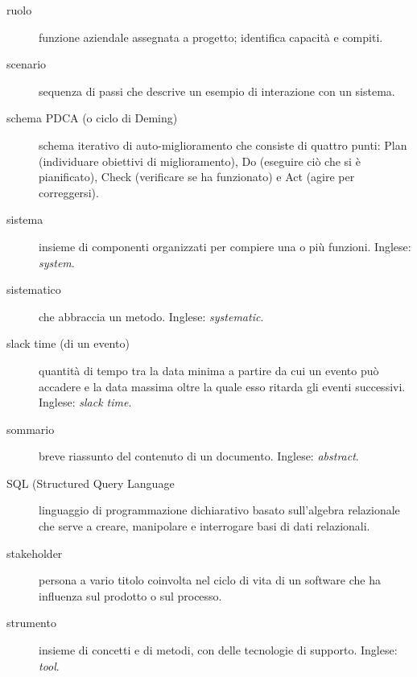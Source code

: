 \documentclass[a4paper]{article}
\begin{document}
\begin{description}
	\item[ruolo] 

			funzione aziendale assegnata a progetto; identifica capacità e compiti.
			
	\item[scenario] 

			sequenza di passi che descrive un esempio di interazione con un sistema.
			
	\item[schema PDCA (o ciclo di Deming)] 

			schema iterativo di auto-miglioramento che consiste di quattro punti: Plan (individuare obiettivi di miglioramento), Do (eseguire ciò che si è pianificato), Check (verificare se ha funzionato) e Act (agire per correggersi).
			
	\item[sistema] 

			insieme di componenti organizzati per compiere una o più funzioni. Inglese: \emph{system}.
			
	\item[sistematico] 

			che abbraccia un metodo. Inglese: \emph{systematic}.
			
	\item[slack time (di un evento)] 

			quantità di tempo tra la data minima a partire da cui un evento può accadere e la data massima oltre la quale esso ritarda gli eventi successivi. Inglese: \emph{slack time}.
			
	\item[sommario] 

			breve riassunto del contenuto di un documento. Inglese: \emph{abstract}.
			
	\item[SQL (Structured Query Language] 

			linguaggio di programmazione dichiarativo basato sull'algebra relazionale che serve a creare, manipolare e interrogare basi di dati relazionali.
			
	\item[stakeholder] 

			persona a vario titolo coinvolta nel ciclo di vita di un software che ha influenza sul prodotto o sul processo.
			
	\item[strumento] 

			insieme di concetti e di metodi, con delle tecnologie di supporto. Inglese: \emph{tool}.
			

\end{description}
\end{document}
